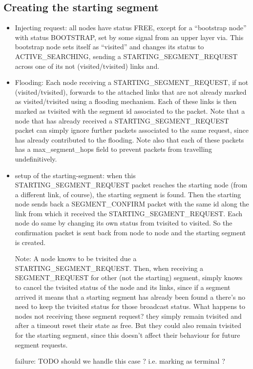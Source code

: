 \documentclass[final,journal,letterpaper]{IEEEtran}
\begin{document}
\subsection{Creating the starting segment}

\begin{itemize}

\item{Injecting request}: all nodes have status FREE, except for a
“bootstrap node” with status BOOTSTRAP, set by some signal from an
upper layer via. This bootstrap node sets itself as “visited” and
changes its status to ACTIVE\_SEARCHING, sending a
STARTING\_SEGMENT\_REQUEST across one of its not (visited/tvisited)
links and.  

\item{Flooding}: Each node receiving a STARTING\_SEGMENT\_REQUEST,
if not (visited/tvisited),  forwards  to the attached links that are
not already marked as visited/tvisited using a flooding mechanism.
Each of these links is then marked as tvisited with the segment id
associated to the packet. Note that a node that has already received a
STARTING\_SEGMENT\_REQUEST packet can simply ignore further packets
associated to the same request, since has already contributed to the
flooding. Note also that each of these packets has a max\_segment\_hops
field to prevent packets from travelling undefinitively.  

\item{setup of the starting-segment}: when this STARTING\_SEGMENT\_REQUEST packet reaches
the starting node (from a different link, of course), the starting
segment is found. Then the starting node sends back a SEGMENT\_CONFIRM
packet with the same id along the link from which it received the
STARTING\_SEGMENT\_REQUEST. Each node do same by changing its own status
from tvisited to visited. So the confirmation packet is sent back from
node to node and the starting segment is created. 

Note: A node knows to be tvisited due a  STARTING\_SEGMENT\_REQUEST.
Then, when receiving a SEGMENT\_REQUEST for other (not the starting)
segment, simply knows to cancel the tvisited status of the node and
its links, since if a segment arrived it means that a starting segment
has already been found a there’s no need to keep the tvisited status
for those broadcast status. What happens to nodes not receiving these
segment request? they simply remain tvisited and after a timeout reset
their state as free. But they could also remain tvisited for the
starting segment, since this doesn’t affect their behaviour for future
segment requests.  

failure: TODO should we handle this case ? i.e.
marking as terminal ?

\end{itemize}
\end{document}
